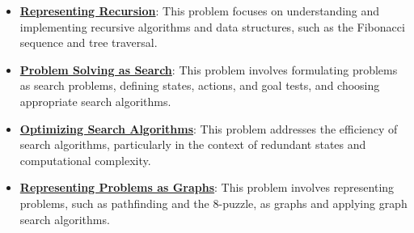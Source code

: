 \documentclass{article}%
\begin{document}
\begin{itemize}[leftmargin=*]%
\item \href{https://purdue.brightspace.com/d2l/common/assets/pdfjs-d2l-dist/1.0.14-legacy/web/viewer.html?file=\%2Fcontent\%2Fenforced\%2F1095467-wl.202510.CS.24300.001\%2F14L1-DepthFS.pdf\%3Fou\%3D1095467\&lang=en-us\&container=d2l-fileviewer-rendered-pdf\&fullscreen=d2l-fileviewer-rendered-pdf-dialog\&height=667#page=3}{\textbf{Representing Recursion}}: This problem focuses on understanding and implementing recursive algorithms and data structures, such as the Fibonacci sequence and tree traversal.%
\item \href{https://purdue.brightspace.com/d2l/common/assets/pdfjs-d2l-dist/1.0.14-legacy/web/viewer.html?file=\%2Fcontent\%2Fenforced\%2F1095467-wl.202510.CS.24300.001\%2F14L1-DepthFS.pdf\%3Fou\%3D1095467\&lang=en-us\&container=d2l-fileviewer-rendered-pdf\&fullscreen=d2l-fileviewer-rendered-pdf-dialog\&height=667#page=14}{\textbf{Problem Solving as Search}}: This problem involves formulating problems as search problems, defining states, actions, and goal tests, and choosing appropriate search algorithms.%
\item \href{https://purdue.brightspace.com/d2l/common/assets/pdfjs-d2l-dist/1.0.14-legacy/web/viewer.html?file=\%2Fcontent\%2Fenforced\%2F1095467-wl.202510.CS.24300.001\%2F14L1-DepthFS.pdf\%3Fou\%3D1095467\&lang=en-us\&container=d2l-fileviewer-rendered-pdf\&fullscreen=d2l-fileviewer-rendered-pdf-dialog\&height=667#page=21}{\textbf{Optimizing Search Algorithms}}: This problem addresses the efficiency of search algorithms, particularly in the context of redundant states and computational complexity.%
\item \href{https://purdue.brightspace.com/d2l/common/assets/pdfjs-d2l-dist/1.0.14-legacy/web/viewer.html?file=\%2Fcontent\%2Fenforced\%2F1095467-wl.202510.CS.24300.001\%2F14L1-DepthFS.pdf\%3Fou\%3D1095467\&lang=en-us\&container=d2l-fileviewer-rendered-pdf\&fullscreen=d2l-fileviewer-rendered-pdf-dialog\&height=667#page=25}{\textbf{Representing Problems as Graphs}}: This problem involves representing problems, such as pathfinding and the 8-puzzle, as graphs and applying graph search algorithms.%
\end{itemize}%
\end{document}
